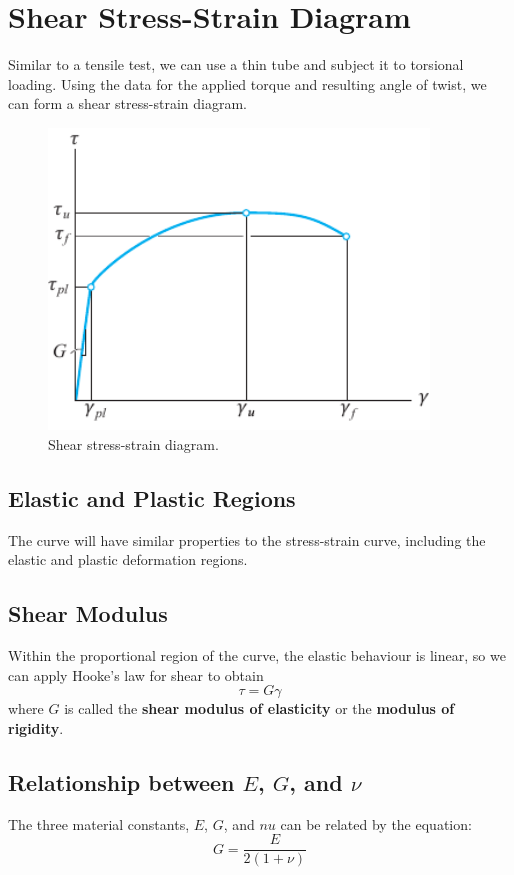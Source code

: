 \documentclass{article}
\begin{document}
\section{Shear Stress-Strain Diagram}
Similar to a tensile test, we can use a thin tube and subject
it to torsional loading. Using the data for the applied torque and resulting
angle of twist, we can form a shear stress-strain diagram.
\begin{figure}[H]
    \centering
    \includegraphics[height = 8cm, keepaspectratio = true]{figures/shear_stress_strain_diagram.pdf}
    \caption{Shear stress-strain diagram.}
\end{figure}
\subsection{Elastic and Plastic Regions}
The curve will have similar properties to the stress-strain curve,
including the elastic and plastic deformation regions.
\subsection{Shear Modulus}
Within the proportional region of the curve, the elastic behaviour
is linear, so we can apply Hooke's law for shear to obtain
\begin{equation*}
    \tau = G \gamma
\end{equation*}
where \(G\) is called the \textbf{shear modulus of elasticity} or the \textbf{modulus of rigidity}.
\subsection{Relationship between \texorpdfstring{\(E\)}{E}, \texorpdfstring{\(G\)}{G}, and \texorpdfstring{\(\nu\)}{v}}
The three material constants, \(E\), \(G\), and \(nu\) can be related by the equation:
\begin{equation*}
    G = \frac{E}{2\left( 1 + \nu \right)}
\end{equation*}
\end{document}
